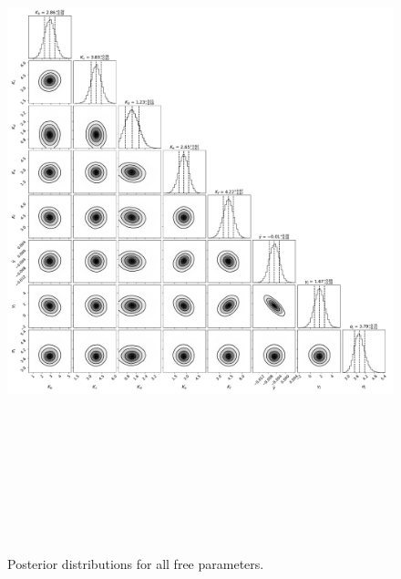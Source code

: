 \documentclass{emulateapj}
\begin{document}
 
\begin{figure}[!h]
\centering

\includegraphics[height=8.0in,width=6.0in,keepaspectratio]{TOI-1246_default_corner.pdf}
\caption{Posterior distributions for all free parameters.}
\end{figure} 

 
\end{document}
